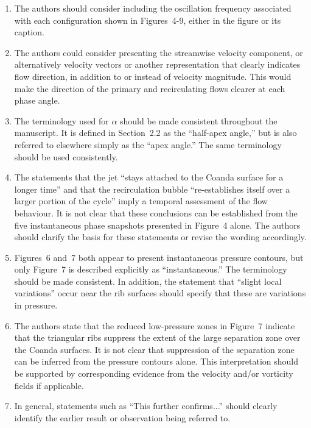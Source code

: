 \documentclass[11pt]{article}
\begin{document}
\begin{enumerate}
		\item The authors should consider including the oscillation frequency associated with each configuration shown in Figures~4-9, either in the figure or its caption. 
		
		\item The authors could consider presenting the streamwise velocity component, or alternatively velocity vectors or another representation that clearly indicates flow direction, in addition to or instead of velocity magnitude. This would make the direction of the primary and recirculating flows clearer at each phase angle.
		
		\item The terminology used for $\alpha$ should be made consistent throughout the manuscript. It is defined in Section~2.2 as the ``half-apex angle,'' but is also referred to elsewhere simply as the ``apex angle.'' The same terminology should be used consistently.
		
		\item The statements that the jet ``stays attached to the Coanda surface for a longer time'' and that the recirculation bubble ``re-establishes itself over a larger portion of the cycle'' imply a temporal assessment of the flow behaviour. It is not clear that these conclusions can be established from the five instantaneous phase snapshots presented in Figure~4 alone. The authors should clarify the basis for these statements or revise the wording accordingly.
		
		\item Figures~6 and~7 both appear to present instantaneous pressure contours, but only Figure~7 is described explicitly as ``instantaneous.'' The terminology should be made consistent. In addition, the statement that ``slight local variations'' occur near the rib surfaces should specify that these are variations in pressure.
		
		\item The authors state that the reduced low-pressure zones in Figure~7 indicate that the triangular ribs suppress the extent of the large separation zone over the Coanda surfaces. It is not clear that suppression of the separation zone can be inferred from the pressure contours alone. This interpretation should be supported by corresponding evidence from the velocity and/or vorticity fields if applicable.
		
		\item In general, statements such as ``This further confirms...'' should clearly identify the earlier result or observation being referred to.
		

\end{enumerate}
\end{document}
